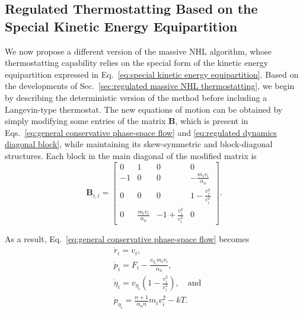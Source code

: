 \documentclass[
aip,
jcp,
reprint,
]{revtex4-1}
\newcommand{\mt}[1]{\boldsymbol{\mathbf{#1}}}          %
\newcommand{\nn}{n}
\begin{document}
\subsection{Regulated Thermostatting Based on the Special Kinetic Energy Equipartition}
\label{sec:twice-regulated massive NHL thermostatting}

We now propose a different version of the massive NHL algorithm, whose thermostatting capability relies on the special form of the kinetic energy equipartition expressed in Eq.~\eqref{eq:special kinetic energy equipartition}.
Based on the developments of Sec.~\ref{sec:regulated massive NHL thermostatting}, we begin by describing the deterministic version of the method before including a Langevin-type thermostat.
The new equations of motion can be obtained by simply modifying some entries of the matrix $\mt B$, which is present in Eqs.~\eqref{eq:general conservative phase-space flow} and \eqref{eq:regulated dynamics diagonal block}, while maintaining its skew-symmetric and block-diagonal structures.
Each block in the main diagonal of the modified matrix is
\begin{equation}
{\mt B}_{i,i} =
\left[
\begin{array}{cccc}
	0  &             1              &            0             &              0              \\
	-1 &             0              &            0             & -\frac{m_i v_i}{\alpha_\nn} \\
	0  &             0              &            0             &   1 - \frac{v_i^2}{c_i^2}   \\
	0  & \frac{m_i v_i}{\alpha_\nn} & -1 + \frac{v_i^2}{c_i^2} &              0
\end{array}
\right].
\end{equation}

As a result, Eq.~\eqref{eq:general conservative phase-space flow} becomes
\begin{subequations}
	\label{eq:modified massive Nose-Hoover equations}
	\begin{align}
	&\dot{r}_i = v_i, \\
	&\dot{p}_i = F_i - \frac{v_{\eta_i} m_i v_i}{\alpha_\nn},  \label{eq:modified massive Nose-Hoover p} \\
	&\dot{\eta}_i = v_{\eta_i}\left(1 - \frac{v_i^2}{c_i^2}\right), \quad \mathrm{and} \\
	&\dot{p}_{\eta_i} = \frac{\nn+1}{\alpha_\nn \nn} m_i v_i^2 - kT \label{eq:modified massive Nose-Hoover p_eta}.
	\end{align}
\end{subequations}
\end{document}
